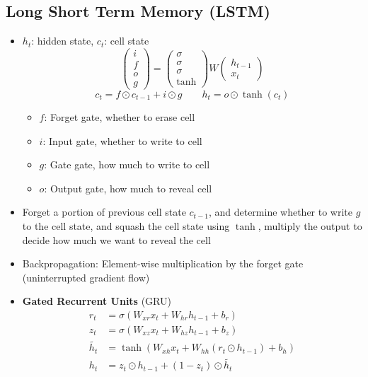 \subsection{Long Short Term Memory (LSTM)}
\begin{itemize}
	\item $h_t$: hidden state, $c_t$: cell state
	$$
		\begin{pmatrix}
		 i \\ f \\ o \\ g
		\end{pmatrix} =
		\begin{pmatrix}
			\sigma \\ \sigma \\ \sigma \\ \tanh
		\end{pmatrix}
		W \begin{pmatrix}
		h_{t-1} \\x_t
		\end{pmatrix}
	$$
	$$c_t = f\odot c_{t-1} + i\odot g \qquad h_t = o\odot \tanh(c_t)$$
	\begin{itemize}
		\item $f$: Forget gate, whether to erase cell
		\item $i$: Input gate, whether to write to cell
		\item $g$: Gate gate, how much to write to cell
		\item $o$: Output gate, how much to reveal cell
	\end{itemize}
	\item Forget a portion of previous cell state $c_{t-1}$, and determine whether to write $g$ to the cell state, and squash the cell state using $\tanh$, multiply the output to decide how much we want to reveal the cell
	\item Backpropagation: Element-wise multiplication by the forget gate (uninterrupted gradient flow)
	\item \textbf{Gated Recurrent Units} (GRU)
	$$
	\begin{aligned}
	r_t &= \sigma(W_{xr}x_t + W_{hr}h_{t-1} + b_r) \\
	z_t &= \sigma(W_{xz}x_t + W_{hz}h_{t-1} + b_z) \\
	\widetilde{h_t} &= \tanh(W_{xh}x_t + W_{hh}(r_t\odot h_{t-1}) + b_h)\\
	h_t &= z_t \odot h_{t-1} + (1-z_t) \odot \widetilde{h_t}
	\end{aligned}	
	$$
\end{itemize}



